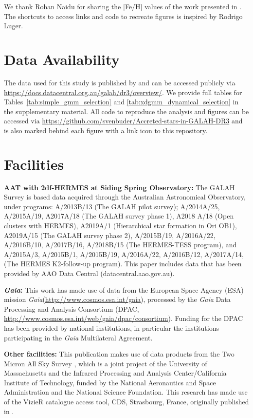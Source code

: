 \documentclass[fleqn,usenatbib]{mnras}
\newcommand{\Gaia}{\textit{Gaia}\xspace} %
\begin{document}
We thank Rohan Naidu for sharing the [Fe/H] values of the work presented in \citet{Naidu2020}. The shortcuts to access links and code to recreate figures is inspired by Rodrigo Luger.

\section*{Data Availability}

The data used for this study is published by \citet{Buder2021} and can be accessed publicly via \url{https://docs.datacentral.org.au/galah/dr3/overview/}.
We provide full tables for Tables~\ref{tab:simple_gmm_selection} and \ref{tab:xdgmm_dynamical_selection} in the supplementary material. All code to reproduce the analysis and figures can be accessed via \url{https://github.com/svenbuder/Accreted-stars-in-GALAH-DR3} and is also marked behind each figure with a link icon to this repository.

\section*{Facilities}

\textbf{AAT with 2df-HERMES at Siding Spring Observatory:}
The GALAH Survey is based data acquired through the Australian Astronomical Observatory, under programs: A/2013B/13 (The GALAH pilot survey); A/2014A/25, A/2015A/19, A2017A/18 (The GALAH survey phase 1), A2018 A/18 (Open clusters with HERMES), A2019A/1 (Hierarchical star formation in Ori OB1), A2019A/15 (The GALAH survey phase 2), A/2015B/19, A/2016A/22, A/2016B/10, A/2017B/16, A/2018B/15 (The HERMES-TESS program), and A/2015A/3, A/2015B/1, A/2015B/19, A/2016A/22, A/2016B/12, A/2017A/14, (The HERMES K2-follow-up program). This paper includes data that has been provided by AAO Data Central (datacentral.aao.gov.au).

\textbf{\Gaia: } This work has made use of data from the European Space Agency (ESA) mission \Gaia (\url{http://www.cosmos.esa.int/gaia}), processed by the \Gaia Data Processing and Analysis Consortium (DPAC, \url{http://www.cosmos.esa.int/web/gaia/dpac/consortium}). Funding for the DPAC has been provided by national institutions, in particular the institutions participating in the \Gaia Multilateral Agreement. 

\textbf{Other facilities:} This publication makes use of data products from the Two Micron All Sky Survey \citep{Skrutskie2006}, which is a joint project of the University of Massachusetts and the Infrared Processing and Analysis Center/California Institute of Technology, funded by the National Aeronautics and Space Administration and the National Science Foundation. This research has made use of the VizieR catalogue access tool, CDS, Strasbourg, France, originally published in \citet{Vizier2000}.
\end{document}
